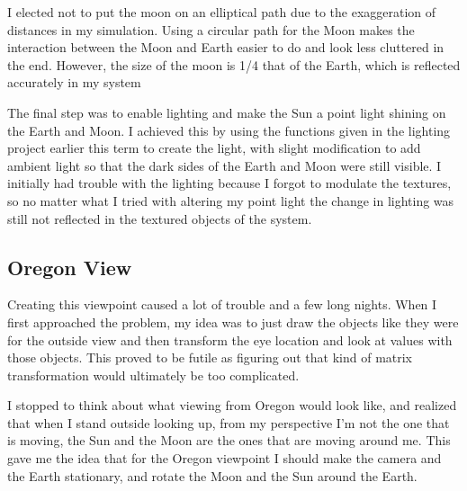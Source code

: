 \documentclass[12pt,serif,draftclsnofoot,onecolumn]{IEEEtran}
\begin{document}
	\newline
			I elected not to put the moon on an elliptical path due to the exaggeration of distances in my simulation. Using a circular path for the Moon makes the interaction between the Moon and Earth easier to do and look less cluttered in the end. However, the size of the moon is 1/4 that of the Earth, which is reflected accurately in my system
	\newline
	\par
			The final step was to enable lighting and make the Sun a point light shining on the Earth and Moon. I achieved this by using the functions given in the lighting project earlier this term to create the light, with slight modification to add ambient light so that the dark sides of the Earth and Moon were still visible. I initially had trouble with the lighting because I forgot to modulate the textures, so no matter what I tried with altering my point light the change in lighting was still not reflected in the textured objects of the system.
	\newline
	\subsection{Oregon View}
	\par
			Creating this viewpoint caused a lot of trouble and a few long nights. When I first approached the problem, my idea was to just draw the objects like they were for the outside view and then transform the eye location and look at values with those objects. This proved to be futile as figuring out that kind of matrix transformation would ultimately be too complicated. 
	\newline
	\par
			I stopped to think about what viewing from Oregon would look like, and realized that when I stand outside looking up, from my perspective I'm not the one that is moving, the Sun and the Moon are the ones that are moving around me. This gave me the idea that for the Oregon viewpoint I should make the camera and the Earth stationary, and rotate the Moon and the Sun around the Earth. 
 	
\end{document}
